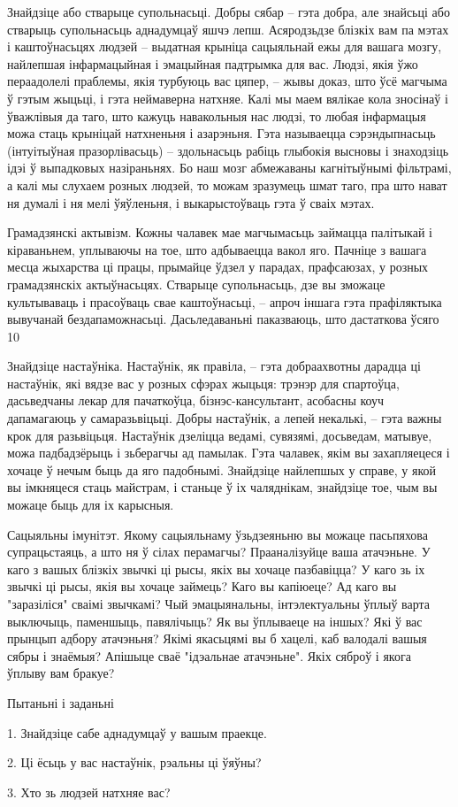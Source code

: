 Знайдзіце або стварыце супольнасьці. Добры сябар – гэта добра, але знайсьці або стварыць супольнасьць аднадумцаў яшчэ лепш. Асяродзьдзе блізкіх вам па мэтах і каштоўнасьцях людзей – выдатная крыніца сацыяльнай ежы для вашага мозгу, найлепшая інфармацыйная і эмацыйная падтрымка для вас. Людзі, якія ўжо пераадолелі праблемы, якія турбуюць вас цяпер, – жывы доказ, што ўсё магчыма ў гэтым жыцьці, і гэта неймаверна натхняе. Калі мы маем вялікае кола зносінаў і ўважлівыя да таго, што кажуць навакольныя нас людзі, то любая інфармацыя можа стаць крыніцай натхненьня і азарэньня. Гэта называецца сэрэндыпнасьць (інтуітыўная празорлівасьць) – здольнасьць рабіць глыбокія высновы і знаходзіць ідэі ў выпадковых назіраньнях. Бо наш мозг абмежаваны кагнітыўнымі фільтрамі, а калі мы слухаем розных людзей, то можам зразумець шмат таго, пра што нават ня думалі і ня мелі ўяўленьня, і выкарыстоўваць гэта ў сваіх мэтах.

Грамадзянскі актывізм. Кожны чалавек мае магчымасьць займацца палітыкай і кіраваньнем, уплываючы на тое, што адбываецца вакол яго. Пачніце з вашага месца жыхарства ці працы, прымайце ўдзел у парадах, прафсаюзах, у розных грамадзянскіх актыўнасьцях. Стварыце супольнасьць, дзе вы зможаце культываваць і прасоўваць свае каштоўнасьці, – апроч іншага гэта прафіляктыка вывучанай бездапаможнасьці. Дасьледаваньні паказваюць, што дастаткова ўсяго 10%

Знайдзіце настаўніка. Настаўнік, як правіла, -- гэта добраахвотны дарадца ці настаўнік, які вядзе вас у розных сфэрах жыцьця: трэнэр для спартоўца, дасьведчаны лекар для пачаткоўца, бізнэс-кансультант, асобасны коуч дапамагаюць у самаразьвіцьці. Добры настаўнік, а лепей некалькі, – гэта важны крок для разьвіцьця. Настаўнік дзеліцца ведамі, сувязямі, досьведам, матывуе, можа падбадзёрыць і зьберагчы ад памылак. Гэта чалавек, якім вы захапляецеся і хочаце ў нечым быць да яго падобнымі. Знайдзіце найлепшых у справе, у якой вы імкняцеся стаць майстрам, і станьце ў іх чаляднікам, знайдзіце тое, чым вы можаце быць для іх карысныя.

Сацыяльны імунітэт. Якому сацыяльнаму ўзьдзеяньню вы можаце пасьпяхова супрацьстаяць, а што ня ў сілах перамагчы? Прааналізуйце ваша атачэньне. У каго з вашых блізкіх звычкі ці рысы, якіх вы хочаце пазбавіцца? У каго зь іх звычкі ці рысы, якія вы хочаце займець? Каго вы капіюеце? Ад каго вы "заразіліся" сваімі звычкамі? Чый эмацыянальны, інтэлектуальны ўплыў варта выключыць, паменшыць, павялічыць? Як вы ўплываеце на іншых? Які ў вас прынцып адбору атачэньня? Якімі якасьцямі вы б хацелі, каб валодалі вашыя сябры і знаёмыя? Апішыце сваё "ідэальнае атачэньне". Якіх сяброў і якога ўплыву вам бракуе?

Пытаньні і заданьні

1. Знайдзіце сабе аднадумцаў у вашым праекце.

2. Ці ёсьць у вас настаўнік, рэальны ці ўяўны?

3. Хто зь людзей натхняе вас?
